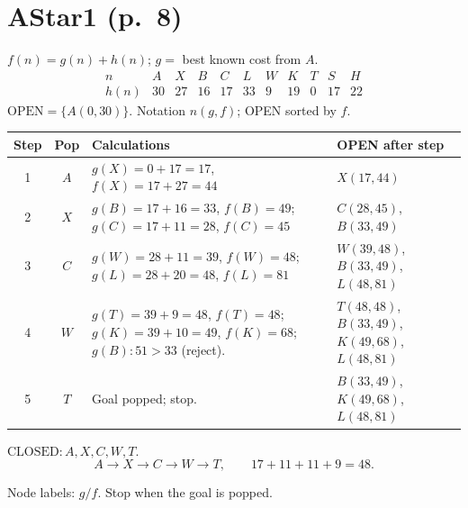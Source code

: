 \documentclass[11pt,a4paper]{article}
\newcommand{\question}[2]{\section*{#1}}
\begin{document}
\newpage
\question{AStar1 (p.\ 8)}{A* with $h(B)=16$}
$f(n)=g(n)+h(n)$; $g=$ best known cost from $A$.
\[
\begin{array}{c|rrrrrrrrrr}
n&A&X&B&C&L&W&K&T&S&H\\\hline
h(n)&30&27&16&17&33&9&19&0&17&22
\end{array}
\]
$\mathrm{OPEN}=\{A(0,30)\}$. Notation $n(g,f)$; OPEN sorted by $f$.
\begin{center}\small\begin{tabular}{c|c|>{\raggedright\arraybackslash}p{6.4cm}|>{\raggedright\arraybackslash}p{4.4cm}}\toprule
Step&Pop&Calculations&OPEN after step\\\midrule
1&$A$&$g(X)=0+17=17$, $f(X)=17+27=44$&$X(17,44)$\\
2&$X$&$g(B)=17+16=33$, $f(B)=49$; $g(C)=17+11=28$, $f(C)=45$&$C(28,45)$, $B(33,49)$\\
3&$C$&$g(W)=28+11=39$, $f(W)=48$; $g(L)=28+20=48$, $f(L)=81$&$W(39,48)$, $B(33,49)$, $L(48,81)$\\
4&$W$&$g(T)=39+9=48$, $f(T)=48$; $g(K)=39+10=49$, $f(K)=68$;  $g(B):51>33$ (reject).&$T(48,48)$, $B(33,49)$, $K(49,68)$, $L(48,81)$\\
5&$T$&Goal popped; stop.&$B(33,49)$, $K(49,68)$, $L(48,81)$\\\bottomrule\end{tabular}\normalsize\end{center}
$\mathrm{CLOSED}: A,X,C,W,T$.
\[
\boxed{A\to X\to C\to W\to T},\qquad
\boxed{17+11+11+9=48}.
\]
\begin{center}\end{center}
Node labels: $g/f$. Stop when the goal is popped.
\end{document}

